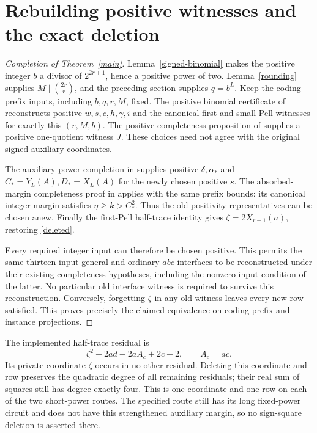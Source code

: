 \documentclass[11pt]{article}
\begin{document}
\section{Rebuilding positive witnesses and the exact deletion}

\begin{proof}[Completion of Theorem~\ref{main}]
Lemma~\ref{signed-binomial} makes the positive integer \(b\) a
divisor of \(2^{2r+1}\), hence a positive power of two.
Lemma~\ref{rounding} supplies \(M\mid\binom{2r}{r}\), and
the preceding section supplies \(q=b^L\). Keep the coding-prefix
inputs, including \(b,q,r,M\), fixed. The positive binomial
certificate of \cite[Theorem 1]{Binomial} reconstructs positive
\(w,s,c,h,\gamma,i\) and the canonical first and small Pell
witnesses for exactly this \((r,M,b)\). The positive-completeness
proposition of \cite{CRT} supplies a positive one-quotient witness
\(J\). These choices need not agree with the original signed
auxiliary coordinates.

The auxiliary power completion in \cite{Power} supplies positive
\(\delta,\alpha_*\) and \(C_*=Y_L(A),D_*=X_L(A)\) for
the newly chosen positive \(s\). The absorbed-margin completeness
proof in \cite{SignedQ} applies with the same prefix bounds:
its canonical integer margin satisfies \(\eta\ge k>C_*^2\).
Thus the old positivity representatives can be chosen anew.
Finally the first-Pell half-trace identity gives
\(\zeta=2X_{r+1}(a)\), restoring \eqref{deleted}.

Every required integer input can therefore be chosen positive.
This permits the same thirteen-input general and ordinary-\(abc\)
interfaces to be reconstructed under their existing completeness
hypotheses, including the nonzero-input condition of the latter.
No particular old interface witness is required to survive this
reconstruction. Conversely, forgetting \(\zeta\) in any old
witness leaves every new row satisfied. This proves precisely the
claimed equivalence on coding-prefix and instance projections.
\end{proof}

The implemented half-trace residual is
\[
                    \zeta^2-2ad-2aA_c+2c-2,
                    \qquad A_c=ac.
\]
Its private coordinate \(\zeta\) occurs in no other residual.
Deleting this coordinate and row preserves the quadratic degree of
all remaining residuals; their real sum of squares still has degree
exactly four. This is one coordinate and one row on each of the two
short-power routes. The specified route still has its long fixed-power
circuit and does not have this strengthened auxiliary margin, so
no sign-square deletion is asserted there.
\end{document}
